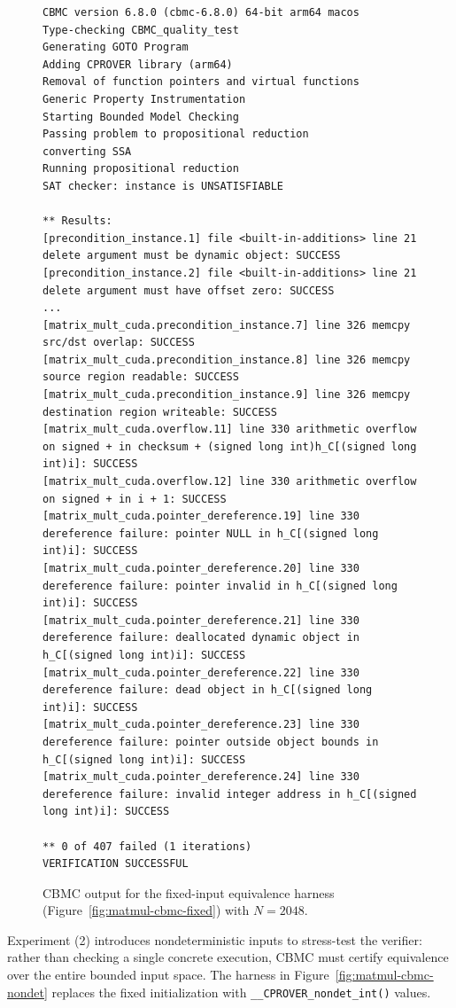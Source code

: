 \documentclass{article}
\begin{document}
\begin{figure}[H]
\begin{verbatim}
CBMC version 6.8.0 (cbmc-6.8.0) 64-bit arm64 macos
Type-checking CBMC_quality_test
Generating GOTO Program
Adding CPROVER library (arm64)
Removal of function pointers and virtual functions
Generic Property Instrumentation
Starting Bounded Model Checking
Passing problem to propositional reduction
converting SSA
Running propositional reduction
SAT checker: instance is UNSATISFIABLE

** Results:
[precondition_instance.1] file <built-in-additions> line 21 delete argument must be dynamic object: SUCCESS
[precondition_instance.2] file <built-in-additions> line 21 delete argument must have offset zero: SUCCESS
...
[matrix_mult_cuda.precondition_instance.7] line 326 memcpy src/dst overlap: SUCCESS
[matrix_mult_cuda.precondition_instance.8] line 326 memcpy source region readable: SUCCESS
[matrix_mult_cuda.precondition_instance.9] line 326 memcpy destination region writeable: SUCCESS
[matrix_mult_cuda.overflow.11] line 330 arithmetic overflow on signed + in checksum + (signed long int)h_C[(signed long int)i]: SUCCESS
[matrix_mult_cuda.overflow.12] line 330 arithmetic overflow on signed + in i + 1: SUCCESS
[matrix_mult_cuda.pointer_dereference.19] line 330 dereference failure: pointer NULL in h_C[(signed long int)i]: SUCCESS
[matrix_mult_cuda.pointer_dereference.20] line 330 dereference failure: pointer invalid in h_C[(signed long int)i]: SUCCESS
[matrix_mult_cuda.pointer_dereference.21] line 330 dereference failure: deallocated dynamic object in h_C[(signed long int)i]: SUCCESS
[matrix_mult_cuda.pointer_dereference.22] line 330 dereference failure: dead object in h_C[(signed long int)i]: SUCCESS
[matrix_mult_cuda.pointer_dereference.23] line 330 dereference failure: pointer outside object bounds in h_C[(signed long int)i]: SUCCESS
[matrix_mult_cuda.pointer_dereference.24] line 330 dereference failure: invalid integer address in h_C[(signed long int)i]: SUCCESS

** 0 of 407 failed (1 iterations)
VERIFICATION SUCCESSFUL
\end{verbatim}
\caption{CBMC output for the fixed-input equivalence harness (Figure~\ref{fig:matmul-cbmc-fixed}) with $N = 2048$.}
\label{fig:cbmc-matmul-fixed-output}
\end{figure}

Experiment (2) introduces nondeterministic inputs to stress-test the verifier: rather than checking a single concrete execution, CBMC must certify equivalence over the entire bounded input space. The harness in Figure~\ref{fig:matmul-cbmc-nondet} replaces the fixed initialization with \texttt{\_\_CPROVER\_nondet\_int()} values.
\end{document}
